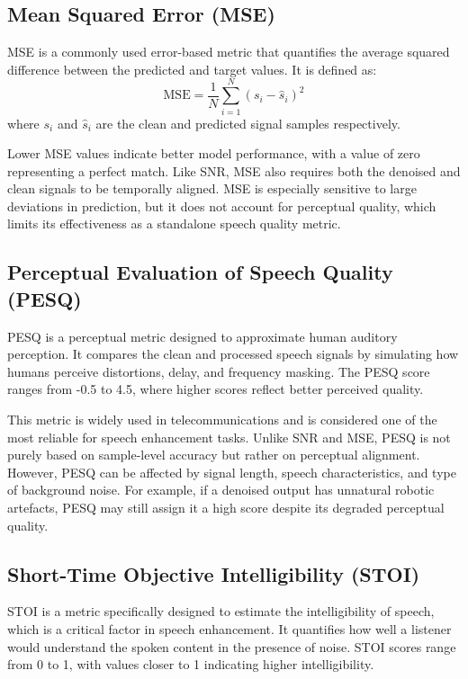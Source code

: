 \subsection{Mean Squared Error (MSE)}

MSE is a commonly used error-based metric that quantifies the average squared difference between the predicted and target values. It is defined as:
\begin{equation}
\text{MSE} = \frac{1}{N} \sum_{i=1}^{N} (s_i - \hat{s}_i)^2
\end{equation}
where $s_i$ and $\hat{s}_i$ are the clean and predicted signal samples respectively.

Lower MSE values indicate better model performance, with a value of zero representing a perfect match. Like SNR, MSE also requires both the denoised and clean signals to be temporally aligned. MSE is especially sensitive to large deviations in prediction, but it does not account for perceptual quality, which limits its effectiveness as a standalone speech quality metric.

\subsection{Perceptual Evaluation of Speech Quality (PESQ)}

PESQ is a perceptual metric designed to approximate human auditory perception. It compares the clean and processed speech signals by simulating how humans perceive distortions, delay, and frequency masking. The PESQ score ranges from -0.5 to 4.5, where higher scores reflect better perceived quality.

This metric is widely used in telecommunications and is considered one of the most reliable for speech enhancement tasks. Unlike SNR and MSE, PESQ is not purely based on sample-level accuracy but rather on perceptual alignment. However, PESQ can be affected by signal length, speech characteristics, and type of background noise. For example, if a denoised output has unnatural robotic artefacts, PESQ may still assign it a high score despite its degraded perceptual quality.

\subsection{Short-Time Objective Intelligibility (STOI)}

STOI is a metric specifically designed to estimate the intelligibility of speech, which is a critical factor in speech enhancement. It quantifies how well a listener would understand the spoken content in the presence of noise. STOI scores range from 0 to 1, with values closer to 1 indicating higher intelligibility.

